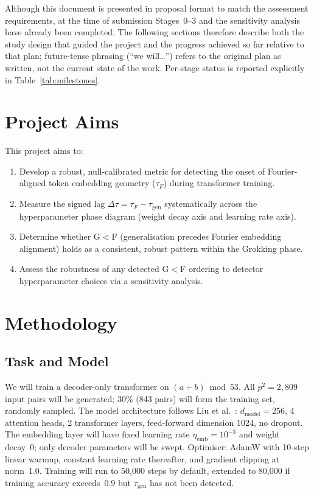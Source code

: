 \documentclass[12pt,openany,oneside,a4paper]{book}
\newcommand{\tab}[1] {Table~\ref{#1}}
\newcommand{\taug}{\tau_{\mathrm{gen}}}
\newcommand{\tauf}{\tau_{F}}
\newcommand{\Dtau}{\Delta\tau}
\begin{document}
Although this document is presented in proposal format to match the
assessment requirements, at the time of submission Stages~0--3 and
the sensitivity analysis have already been completed.
The following sections therefore describe both the study design that
guided the project and the progress achieved so far relative to that
plan; future-tense phrasing (``we will\ldots'') refers to the original
plan as written, not the current state of the work.
Per-stage status is reported explicitly in \tab{tab:milestones}.

\section{Project Aims}

This project aims to:
\begin{enumerate}
  \item Develop a robust, null-calibrated metric for detecting the
    onset of Fourier-aligned token embedding geometry ($\tauf$) during
    transformer training.
  \item Measure the signed lag $\Dtau = \tauf - \taug$ systematically
    across the hyperparameter phase diagram (weight decay axis and
    learning rate axis).
  \item Determine whether G$<$F (generalisation precedes Fourier
    embedding alignment) holds as a consistent, robust pattern within
    the Grokking phase.
  \item Assess the robustness of any detected G$<$F ordering to
    detector hyperparameter choices via a sensitivity analysis.
\end{enumerate}

\section{Methodology}

\subsection{Task and Model}

We will train a decoder-only transformer \cite{vaswani2017attention}
on $(a+b)\bmod 53$.
All $p^2 = 2{,}809$ input pairs will be generated; 30\% (843 pairs)
will form the training set, randomly sampled.
The model architecture follows Liu et al.\ \cite{liu2022towards}:
$d_{\mathrm{model}}=256$, 4 attention heads, 2 transformer layers,
feed-forward dimension 1024, no dropout.
The embedding layer will have fixed learning rate $\eta_{\mathrm{emb}}
= 10^{-3}$ and weight decay~0; only decoder parameters will be swept.
Optimiser: AdamW \cite{loshchilov2019decoupled} with 10-step linear
warmup, constant learning rate thereafter, and gradient clipping at
norm~1.0.
Training will run to 50{,}000 steps by default, extended to 80{,}000
if training accuracy exceeds~0.9 but $\taug$ has not been detected.
\end{document}
